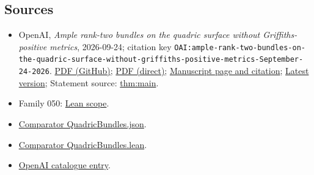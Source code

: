 \documentclass[11pt]{article}
\begin{document}
\subsection{Sources}
\begin{itemize}
\item OpenAI, \emph{Ample rank-two bundles on the quadric surface without Griffiths-positive metrics}, 2026-09-24; citation key \texttt{OAI:ample-rank-two-bundles-on-the-quadric-surface-without-griffiths-positive-metrics-September-24-2026}. \href{https://github.com/openai/math/blob/adc7f1241b42e322a6451854ab7e4b4c146bf78a/preprints/ample-rank-two-bundles-on-the-quadric-surface-without-griffiths-positive-metrics-September-24-2026/paper.pdf}{PDF (GitHub)}; \href{https://github.com/openai/math/raw/adc7f1241b42e322a6451854ab7e4b4c146bf78a/preprints/ample-rank-two-bundles-on-the-quadric-surface-without-griffiths-positive-metrics-September-24-2026/paper.pdf}{PDF (direct)}; \href{https://github.com/openai/math/blob/adc7f1241b42e322a6451854ab7e4b4c146bf78a/preprints/ample-rank-two-bundles-on-the-quadric-surface-without-griffiths-positive-metrics-September-24-2026/README.md}{Manuscript page and citation}; \href{https://github.com/openai/math/blob/main/preprints/ample-rank-two-bundles-on-the-quadric-surface-without-griffiths-positive-metrics-September-24-2026/paper.pdf}{Latest version}; Statement source: \href{https://github.com/openai/math/blob/adc7f1241b42e322a6451854ab7e4b4c146bf78a/preprints/ample-rank-two-bundles-on-the-quadric-surface-without-griffiths-positive-metrics-September-24-2026/build/sections/01-introduction.tex\#L23}{thm:main}.
\item Family 050: \href{https://github.com/openai/math/blob/adc7f1241b42e322a6451854ab7e4b4c146bf78a/lean/docs/050.md}{Lean scope}.
\item \href{https://github.com/openai/math/blob/adc7f1241b42e322a6451854ab7e4b4c146bf78a/lean/ComparatorChallenges/QuadricBundles.json}{Comparator QuadricBundles.json}.
\item \href{https://github.com/openai/math/blob/adc7f1241b42e322a6451854ab7e4b4c146bf78a/lean/ComparatorChallenges/QuadricBundles.lean}{Comparator QuadricBundles.lean}.
\item \href{https://github.com/openai/math/blob/adc7f1241b42e322a6451854ab7e4b4c146bf78a/CONTENTS.md}{OpenAI catalogue entry}.
\end{itemize}
\end{document}
